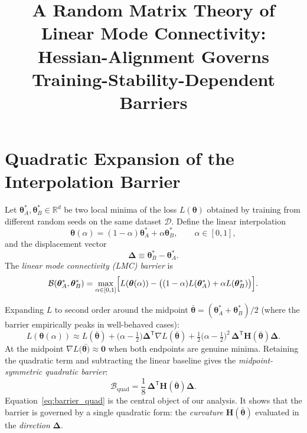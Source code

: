 \documentclass{article}
\newcommand{\R}{\mathbb{R}}
\newcommand{\Hess}{\mathbf{H}}
\newcommand{\btheta}{\bm{\theta}}
\newcommand{\bDelta}{\bm{\Delta}}
\begin{document}
\title{A Random Matrix Theory of Linear Mode Connectivity:\\Hessian-Alignment Governs Training-Stability-Dependent Barriers}
\author{}
\date{}
\maketitle

\section{Quadratic Expansion of the Interpolation Barrier}

Let $\btheta^*_A, \btheta^*_B \in \R^d$ be two local minima of the loss $L(\btheta)$
obtained by training from different random seeds on the same dataset $\mathcal{D}$.
Define the linear interpolation
\begin{equation}
\btheta(\alpha) = (1-\alpha)\btheta^*_A + \alpha\btheta^*_B,\qquad \alpha\in[0,1],
\end{equation}
and the displacement vector
\begin{equation}
\bDelta \equiv \btheta^*_B - \btheta^*_A.
\end{equation}
The \emph{linear mode connectivity (LMC) barrier} is
\begin{equation}
\mathcal{B}(\btheta^*_A,\btheta^*_B) = \max_{\alpha\in[0,1]}
\Bigl[L(\btheta(\alpha)) - \bigl((1-\alpha)L(\btheta^*_A)+\alpha L(\btheta^*_B)\bigr)\Bigr].
\end{equation}

Expanding $L$ to second order around the midpoint $\bar{\btheta}=(\btheta^*_A+\btheta^*_B)/2$
(where the barrier empirically peaks in well-behaved cases):
\begin{equation}
L(\btheta(\alpha)) \approx L(\bar{\btheta})
+ \bigl(\alpha-\tfrac12\bigr)\bDelta^{\mathsf T}\nabla L(\bar{\btheta})
+ \tfrac12\bigl(\alpha-\tfrac12\bigr)^2\,\bDelta^{\mathsf T}\Hess(\bar{\btheta})\bDelta.
\end{equation}
At the midpoint $\nabla L(\bar{\btheta)}\approx \bm{0}$ when both endpoints are
genuine minima. Retaining the quadratic term and subtracting the linear baseline gives
the \emph{midpoint-symmetric quadratic barrier}:
\begin{equation}
\boxed{\mathcal{B}_{\mathrm{quad}} = \frac{1}{8}\,\bDelta^{\mathsf T}\Hess(\bar{\btheta})\bDelta.}
\label{eq:barrier_quad}
\end{equation}
Equation~\eqref{eq:barrier_quad} is the central object of our analysis. It shows that
the barrier is governed by a single quadratic form: the \emph{curvature} $\Hess(\bar{\btheta})$
evaluated in the \emph{direction} $\bDelta$.
\end{document}
